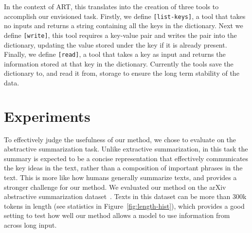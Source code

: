 \documentclass{article}
\begin{document}
In the context of ART, this translates into the creation of three tools to accomplish our envisioned task. Firstly, we define \texttt{[list-keys]}, a tool that takes no inputs and returns a string containing all the keys in the dictionary.
Next we define \texttt{[write]}, this tool requires a key-value pair and writes the pair into the dictionary, updating the value stored under the key if it is already present.
Finally, we define \texttt{[read]}, a tool that takes a key as input and returns the information stored at that key in the dictionary.
Currently the tools save the dictionary to, and read it from, storage to ensure the long term stability of the data.



\section{Experiments}\label{section:experiments}

To effectively judge the usefulness of our method, we chose to evaluate on the abstractive summarization task. Unlike extractive summarization, in this task the summary is expected to be a concise representation that effectively communicates the key ideas in the text, rather than a composition of important phrases in the text. This is more like how humans generally summarize texts, and provides a stronger challenge for our method. We evaluated our method on the arXiv abstractive summarization dataset~\cite{cohan-etal-2018-discourse}. Texts in this dataset can be more than 300k tokens in length (see statistics in Figure~\ref{fig:length-hist}), which provides a good setting to test how well our method allows a model to use information from across long input.
\end{document}
